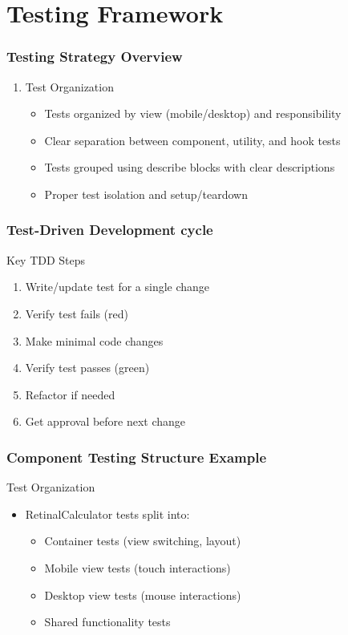 \documentclass{beamer}
\begin{document}
\section{Testing Framework}
\begin{frame}
    \frametitle{Testing Strategy Overview}
    \begin{enumerate}
        \item Test Organization
        \begin{itemize}
            \item Tests organized by view (mobile/desktop) and responsibility
            \item Clear separation between component, utility, and hook tests
            \item Tests grouped using describe blocks with clear descriptions
            \item Proper test isolation and setup/teardown
        \end{itemize}
    \end{enumerate}
\end{frame}

\begin{frame}
    \frametitle{Test-Driven Development cycle}
    \begin{alertblock}{Key TDD Steps}
        \begin{enumerate}
            \item Write/update test for a single change
            \item Verify test fails (red)
            \item Make minimal code changes
            \item Verify test passes (green)
            \item Refactor if needed
            \item Get approval before next change
        \end{enumerate}
    \end{alertblock}
\end{frame}

\begin{frame}
    \frametitle{Component Testing Structure Example}
    \begin{exampleblock}{Test Organization}
        \begin{itemize}
            \item RetinalCalculator tests split into:
            \begin{itemize}
                \item Container tests (view switching, layout)
                \item Mobile view tests (touch interactions)
                \item Desktop view tests (mouse interactions)
                \item Shared functionality tests
            \end{itemize}
        \end{itemize}
    \end{exampleblock}

    \end{frame}
\end{document}
